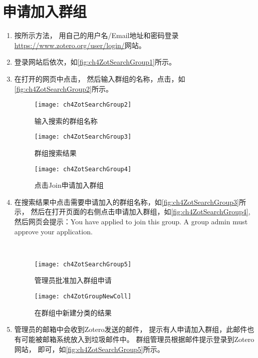 \documentclass[cn,11pt,chinese]{elegantbook}
\begin{document}
\section{申请加入群组}\label{sec:joinGroup}
\begin{enumerate}
	\item 按所示方法，
	用自己的用户名/Email地址和密码登录\url{https://www.zotero.org/user/login/}网站。
	\item 登录网站后依次，如\autoref{fig:ch4ZotSearchGroup1}所示。
	\item 在打开的网页中点击，
	然后输入群组的名称，点击，如\autoref{fig:ch4ZotSearchGroup2}所示。
	
	
	\begin{figure}[t]
		\begin{minipage}[b]{\dimexpr.3\textwidth-1em}
			\centering
			\texttt{[image: ch4ZotSearchGroup2]}
			\caption{输入搜索的群组名称}
			\label{fig:ch4ZotSearchGroup2}
		\end{minipage}
		\begin{minipage}[b]{\dimexpr.3\textwidth-1em}
			\centering
			\texttt{[image: ch4ZotSearchGroup3]}
			\caption{群组搜索结果}
			\label{fig:ch4ZotSearchGroup3}
		\end{minipage}
		\begin{minipage}[b]{\dimexpr.4\textwidth-1em}
			\centering
			\texttt{[image: ch4ZotSearchGroup4]}
			\caption{点击Join申请加入群组}
			\label{fig:ch4ZotSearchGroup4}
		\end{minipage}
	
	\end{figure}
	\item 在搜索结果中点击需要申请加入的群组名称，如\autoref{fig:ch4ZotSearchGroup3}所示，
	然后在打开页面的右侧点击申请加入群组，如\autoref{fig:ch4ZotSearchGroup4},
	然后网页会提示：You have applied to join this group. A group admin must approve your application.
		\begin{figure}[htbp]
			\centering\
			\begin{minipage}[t]{0.6\linewidth}
				\centering
				\texttt{[image: ch4ZotSearchGroup5]}
				\caption{管理员批准加入群组申请}
				\label{fig:ch4ZotSearchGroup5}
			\end{minipage}
			\begin{minipage}[t]{0.3\linewidth}
				\centering
				\texttt{[image: ch4ZotGroupNewColl]}
				\caption{在群组中新建分类的结果}
				\label{fig:ch4ZotGroupNewColl}
			\end{minipage}
		\end{figure}

	\item 管理员的邮箱中会收到Zotero发送的邮件，
	提示有人申请加入群组，此邮件也有可能被邮箱系统放入到垃圾邮件中。
	群组管理员根据邮件提示登录到Zotero网站，
	即可，如\autoref{fig:ch4ZotSearchGroup5}所示。

\end{enumerate}
\end{document}
